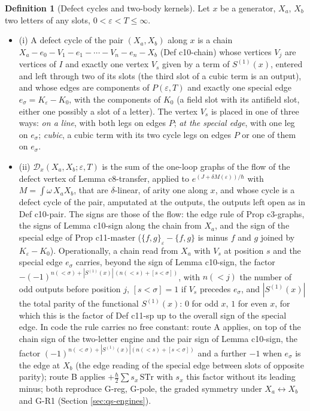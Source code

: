 \documentclass[11pt]{article}
\numberwithin{equation}{section}
\theoremstyle{plain}
\theoremstyle{definition}
\newtheorem{definition}[theorem]{Definition}
\begin{document}
\begin{definition}[Defect cycles and two-body kernels]
\label{def:qs-defect}
Let $x$ be a generator, $X_a$, $X_b$ two letters of any slots, $0<\varepsilon<T\le\infty$.
\begin{itemize}
\item (i) A defect cycle of the pair $(X_a,X_b)$ along $x$ is a chain $X_a-e_0-V_1-e_1-\cdots-V_n-e_n-X_b$ (Def c10-chain) whose vertices $V_j$ are vertices of $I$ and exactly one vertex $V_s$ given by a term of $S^{(1)}(x)$, entered and left through two of its slots (the third slot of a cubic term is an output), and whose edges are components of $P(\varepsilon,T)$ and exactly one special edge $e_\sigma=K_\varepsilon-K_0$, with the components of $K_0$ (a field slot with its antifield slot, either one possibly a slot of a letter). The vertex $V_s$ is placed in one of three ways: \emph{on a line}, with both legs on edges $P$; \emph{at the special edge}, with one leg on $e_\sigma$; \emph{cubic}, a cubic term with its two cycle legs on edges $P$ or one of them on $e_\sigma$.
\item (ii) $\mathcal D_x(X_a,X_b;\varepsilon,T)$ is the sum of the one-loop graphs of the flow of the defect vertex of Lemma c8-transfer, applied to $e^{(J+\delta M(\varepsilon))/\hbar}$ with $M=\int\omega\,X_aX_b$, that are $\delta$-linear, of arity one along $x$, and whose cycle is a defect cycle of the pair, amputated at the outputs, the outputs left open as in Def c10-pair. The signs are those of the flow: the edge rule of Prop c3-graphs, the signs of Lemma c10-sign along the chain from $X_a$, and the sign of the special edge of Prop c11-master ($\{f,g\}_\varepsilon-\{f,g\}$ is minus $f$ and $g$ joined by $K_\varepsilon-K_0$). Operationally, a chain read from $X_a$ with $V_s$ at position $s$ and the special edge $e_\sigma$ carries, beyond the sign of Lemma c10-sign, the factor $-(-1)^{n(<\sigma)+|S^{(1)}(x)|\,(n(<s)+[s<\sigma])}$, with $n(<j)$ the number of odd outputs before position $j$, $[s<\sigma]=1$ if $V_s$ precedes $e_\sigma$, and $|S^{(1)}(x)|$ the total parity of the functional $S^{(1)}(x)$: $0$ for odd $x$, $1$ for even $x$, for which this is the factor of Def c11-sp up to the overall sign of the special edge. In code the rule carries no free constant: route A applies, on top of the chain sign of the two-letter engine and the pair sign of Lemma c10-sign, the factor $(-1)^{n(<\sigma)+|S^{(1)}(x)|(n(<s)+[s<\sigma])}$ and a further $-1$ when $e_\sigma$ is the edge at $X_b$ (the edge reading of the special edge between slots of opposite parity); route B applies $+\tfrac\hbar2\sum s_x\,\mathrm{STr}$ with $s_x$ this factor without its leading minus; both reproduce G-reg, G-pole, the graded symmetry under $X_a\leftrightarrow X_b$ and G-R1 (Section \ref{sec:qs-engines}).

\end{itemize}
\end{definition}
\end{document}
